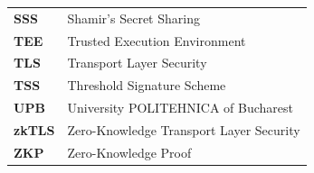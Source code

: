 \begin{longtable}{p{3.2cm} p{11cm}}
\textbf{SSS}      & Shamir's Secret Sharing \\
\textbf{TEE}      & Trusted Execution Environment \\
\textbf{TLS}      & Transport Layer Security \\
\textbf{TSS}      & Threshold Signature Scheme \\
\textbf{UPB}      & University POLITEHNICA of Bucharest \\
\textbf{zkTLS}    & Zero-Knowledge Transport Layer Security \\
\textbf{ZKP}      & Zero-Knowledge Proof \\
\end{longtable}

\newpage

